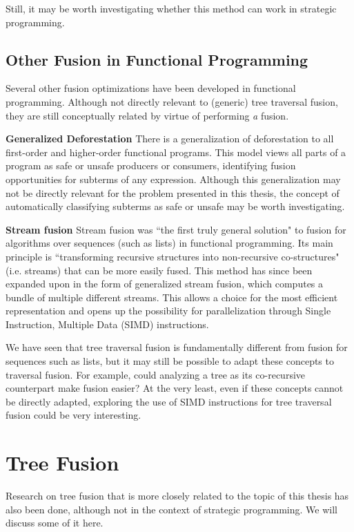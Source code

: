 Still, it may be worth investigating whether this method can work in strategic programming.

\subsection{Other Fusion in Functional Programming}
Several other fusion optimizations have been developed in functional programming. Although not directly relevant to (generic) tree traversal fusion, they are still conceptually related by virtue of performing \textit{a} fusion.

\textbf{Generalized Deforestation} There is a generalization of deforestation to all first-order and higher-order functional programs. This model views all parts of a program as safe or unsafe producers or consumers, identifying fusion opportunities for subterms of any expression\cite{Chin92}. Although this generalization may not be directly relevant for the problem presented in this thesis, the concept of automatically classifying subterms as safe or unsafe may be worth investigating.

\textbf{Stream fusion} Stream fusion was ``the first truly general solution" to fusion for algorithms over sequences (such as lists) in functional programming\cite{Mainland17}. Its main principle is ``transforming recursive structures into non-recursive co-structures" (i.e. streams) that can be more easily fused\cite{Mainland17}. This method has since been expanded upon in the form of generalized stream fusion, which computes a bundle of multiple different streams. This allows a choice for the most efficient representation and opens up the possibility for parallelization through Single Instruction, Multiple Data (SIMD) instructions. 

We have seen that tree traversal fusion is fundamentally different from fusion for sequences such as lists, but it may still be possible to adapt these concepts to traversal fusion. For example, could analyzing a tree as its co-recursive counterpart make fusion easier? At the very least, even if these concepts cannot be directly adapted, exploring the use of SIMD instructions for tree traversal fusion could be very interesting.

\section{Tree Fusion}
Research on tree fusion that is more closely related to the topic of this thesis has also been done, although not in the context of strategic programming. We will discuss some of it here.

